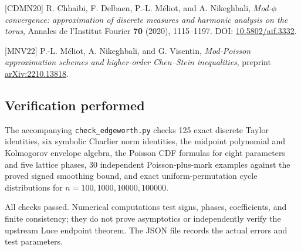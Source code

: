 \documentclass[
  11pt,
]{article}
\begin{document}
{[}CDMN20{]} R. Chhaibi, F. Delbaen, P.-L. Méliot, and A. Nikeghbali,
\emph{Mod-\(\phi\) convergence: approximation of discrete measures and
harmonic analysis on the torus}, Annales de l'Institut Fourier
\textbf{70} (2020), 1115--1197. DOI:
\href{https://doi.org/10.5802/aif.3332}{10.5802/aif.3332}.

{[}MNV22{]} P.-L. Méliot, A. Nikeghbali, and G. Visentin,
\emph{Mod-Poisson approximation schemes and higher-order Chen--Stein
inequalities}, preprint
\href{https://arxiv.org/abs/2210.13818}{arXiv:2210.13818}.

\subsection{Verification performed}\label{verification-performed}

The accompanying \texttt{check\_edgeworth.py} checks 125 exact discrete
Taylor identities, six symbolic Charlier norm identities, the midpoint
polynomial and Kolmogorov envelope algebra, the Poisson CDF formulas for
eight parameters and five lattice phases, 30 independent
Poisson-plus-mark examples against the proved signed smoothing bound,
and exact uniform-permutation cycle distributions for
\(n=100,1000,10000,100000\).

All checks passed. Numerical computations test signs, phases,
coefficients, and finite consistency; they do not prove asymptotics or
independently verify the upstream Luce endpoint theorem. The JSON file
records the actual errors and test parameters.
\end{document}
